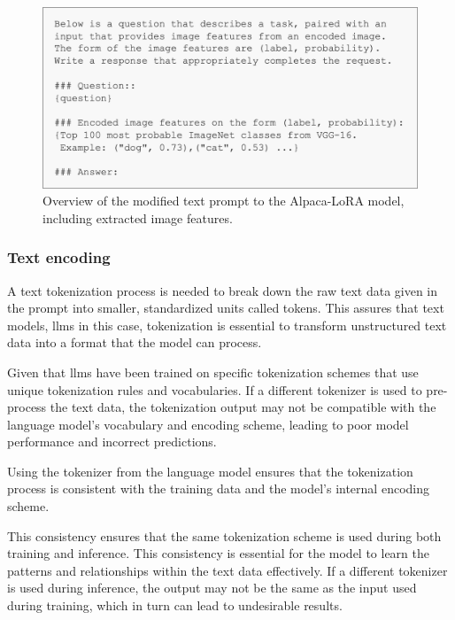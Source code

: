         \begin{figure}[htb]
            \centerline{
            \includegraphics[width=\textwidth]{images/alpaca_modified_prompt_format.png}}
            \caption{Overview of the modified text prompt to the Alpaca-LoRA model, including extracted image features.}
            \label{fig:alpaca_modified_prompt_format}
        \end{figure}


        \subsubsection{Text encoding}
        \label{sec2:text_encoding}

        A text tokenization process is needed to break down the raw text data given in the prompt into smaller, standardized units called tokens. This assures that text models, \glspl{llm} in this case, tokenization is essential to transform unstructured text data into a format that the model can process.
        
        Given that \glspl{llm} have been trained on specific tokenization schemes that use unique tokenization rules and vocabularies. If a different tokenizer is used to pre-process the text data, the tokenization output may not be compatible with the language model's vocabulary and encoding scheme, leading to poor model performance and incorrect predictions.
        
        Using the tokenizer from the language model ensures that the tokenization process is consistent with the training data and the model's internal encoding scheme. 
        
        This consistency ensures that the same tokenization scheme is used during both training and inference. This consistency is essential for the model to learn the patterns and relationships within the text data effectively. If a different tokenizer is used during inference, the output may not be the same as the input used during training, which in turn can lead to undesirable results.
        
